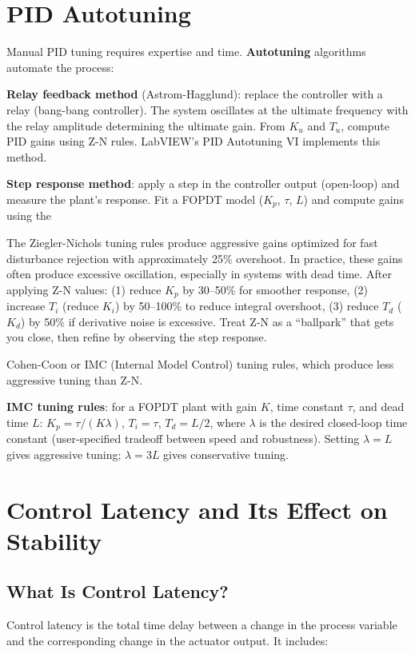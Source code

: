 \documentclass[11pt,letterpaper,twoside,openany]{book}
\begin{document}
\section{PID Autotuning}
Manual PID tuning requires expertise and time. \textbf{Autotuning} algorithms automate the process:

\textbf{Relay feedback method} (Astrom-Hagglund): replace the controller with a relay (bang-bang controller). The system oscillates at the ultimate frequency with the relay amplitude determining the ultimate gain. From $K_u$ and $T_u$, compute PID gains using Z-N rules. LabVIEW's PID Autotuning VI implements this method.

\textbf{Step response method}: apply a step in the controller output (open-loop) and measure the plant's response. Fit a FOPDT model ($K_p$, $\tau$, $L$) and compute gains using the 
\begin{tipbox}
The Ziegler-Nichols tuning rules produce aggressive gains optimized for fast disturbance rejection with approximately 25\% overshoot. In practice, these gains often produce excessive oscillation, especially in systems with dead time. After applying Z-N values: (1) reduce $K_p$ by 30--50\% for smoother response, (2) increase $T_i$ (reduce $K_i$) by 50--100\% to reduce integral overshoot, (3) reduce $T_d$ ($K_d$) by 50\% if derivative noise is excessive. Treat Z-N as a ``ballpark'' that gets you close, then refine by observing the step response.
\end{tipbox}

Cohen-Coon or IMC (Internal Model Control) tuning rules, which produce less aggressive tuning than Z-N.

\textbf{IMC tuning rules}: for a FOPDT plant with gain $K$, time constant $\tau$, and dead time $L$: $K_p = \tau/(K \lambda)$, $T_i = \tau$, $T_d = L/2$, where $\lambda$ is the desired closed-loop time constant (user-specified tradeoff between speed and robustness). Setting $\lambda = L$ gives aggressive tuning; $\lambda = 3L$ gives conservative tuning.
\section{Control Latency and Its Effect on Stability}
\subsection{What Is Control Latency?}
Control latency is the total time delay between a change in the process variable and the corresponding change in the actuator output. It includes:
\end{document}
